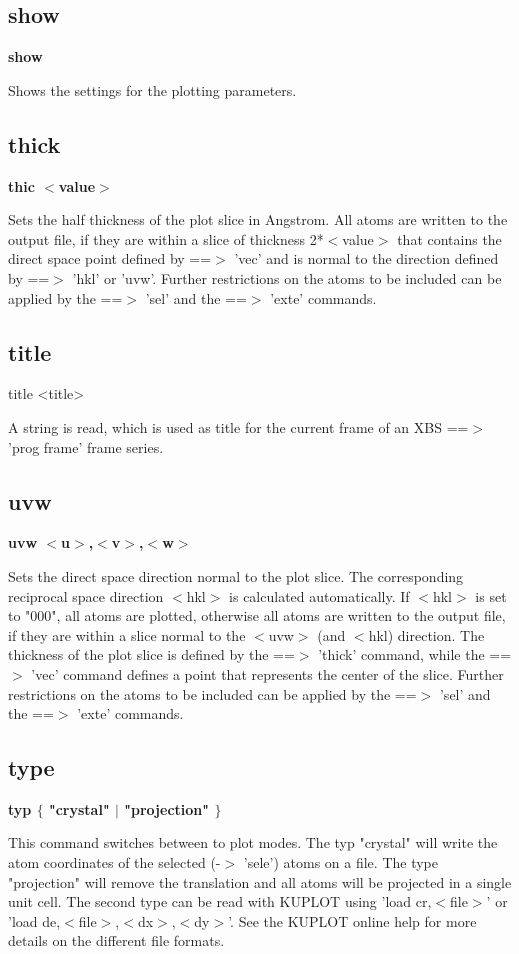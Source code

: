 \subsection*{show}
{\bf show \par }
\par
\vspace{3pt}
Shows the settings for the plotting parameters. 
\subsection*{thick}
{\bf thic $ <$value$> $ \par }
\par
\vspace{3pt}
Sets the half thickness of the plot slice in Angstrom. 
All atoms are written to the output file, if they are within a slice 
of thickness 2*$ <$value$> $ that contains the direct space point defined 
by ==$> $ 'vec' and is normal to the direction defined by ==$> $ 'hkl' or 'uvw'. 
Further restrictions on the atoms to be included can be applied by 
the ==$> $ 'sel' and the ==$> $ 'exte' commands. 
\subsection*{title}
\begin{MacVerbatim}
title <title>
\end{MacVerbatim}
A string is read, which is used as title for the current frame of an 
XBS ==$> $ 'prog frame' frame series. 
\subsection*{uvw}
{\bf uvw $ <$u$> $,$ <$v$> $,$ <$w$> $ \par }
\par
\vspace{3pt}
Sets the direct space direction normal to the plot slice. The 
corresponding reciprocal space direction $ <$hkl$> $ is calculated 
automatically. 
If $ <$hkl$> $ is set to "000", all atoms are plotted, otherwise all 
atoms are written to the output file, if they are within a slice 
normal to the $ <$uvw$> $ (and $ <$hkl) direction. The thickness of the plot 
slice is defined by the ==$> $ 'thick' command, while the ==$> $ 'vec' command 
defines a point that represents the center of the slice. 
Further restrictions on the atoms to be included can be applied by 
the ==$> $ 'sel' and the ==$> $ 'exte' commands. 
\subsection*{type}
{\bf typ $ \{$ "crystal" $| $ "projection" $\} $ \par }
\par
\vspace{3pt}
This command switches between to plot modes. The typ "crystal" will 
write the atom coordinates of the selected (-$> $ 'sele') atoms on a 
file. The type "projection" will remove the translation and all atoms 
will be projected in a single unit cell. The second type can be read 
with KUPLOT using 'load cr,$ <$file$> $' or 'load de,$ <$file$> $,$ <$dx$> $,$ <$dy$> $'. 
See the KUPLOT online help for more details on the different file 
formats. 
